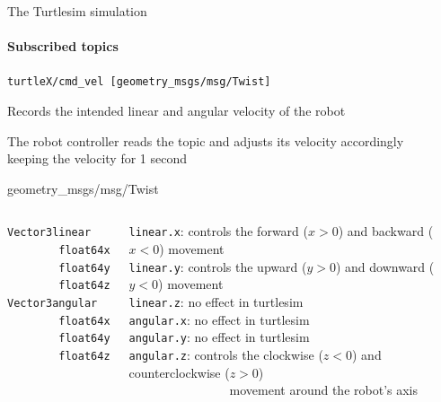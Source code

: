 \documentclass[compress]{beamer}
\begin{document}
\begin{frame}{The Turtlesim simulation}
\framesubtitle{{\bf Subscribed topics}}
\footnotesize
 \texttt{turtleX/cmd\_vel [geometry\_msgs/msg/Twist]}\\ \vspace{.2cm}
 
Records the intended linear and angular velocity of the robot\\ \vspace{.1cm}

The robot controller reads the topic and adjusts its velocity accordingly\\
{\tiny keeping the velocity for 1 second}\\
 
 
 \vspace{.2cm}
 \begin{block}{{\tiny geometry\_msgs/msg/Twist}}
 \begin{columns}
   
    
       \tiny
         \begin{alltt}
            Vector3  linear\\
            \ \ \ \ \ \ \ \ float64 x\\
            \ \ \ \ \ \ \ \ float64 y\\
            \ \ \ \ \ \ \ \ float64 z\\
            Vector3  angular\\
            \ \ \ \ \ \ \ \ float64 x\\
            \ \ \ \ \ \ \ \ float64 y\\
            \ \ \ \ \ \ \ \ float64 z\\
            \ \\            
        \end{alltt}
     \tiny
     \texttt{linear.x}: controls the forward ($x>0$) and backward ($x<0$) movement\\ \vspace{.1cm}
     \texttt{linear.y}: controls the upward ($y>0$)  and  downward ($y<0$) movement\\ \vspace{.1cm}
     \texttt{linear.z}: no effect in turtlesim\\ \vspace{.1cm}
     \texttt{angular.x}: no effect in turtlesim\\ \vspace{.1cm}
     \texttt{angular.y}: no effect in turtlesim\\ \vspace{.1cm}
     \texttt{angular.z}: controls the clockwise ($z<0$) and counterclockwise ($z>0$) \\ \ \ \ \ \ \ \ \ \ \ \ \ \ \ \ \ movement around the robot's axis
 \end{columns}
 \end{block}
\end{frame}
\end{document}

